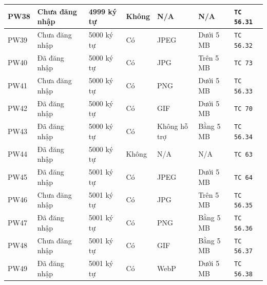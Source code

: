 \documentclass[11pt,a4paper]{article}
\begin{document}
\begin{longtable}{|C{1.2cm}|L{2.4cm}|L{2.6cm}|C{1.6cm}|L{2.5cm}|L{2.2cm}|C{2.0cm}|}
PW38 & Chưa đăng nhập & 4999 ký tự & Không & N/A & N/A & \texttt{TC 56.31} \\ \hline
PW39 & Chưa đăng nhập & 5000 ký tự & Có & JPEG & Dưới 5 MB & \texttt{TC 56.32} \\ \hline
PW40 & Đã đăng nhập & 5000 ký tự & Có & JPG & Trên 5 MB & \texttt{TC 73} \\ \hline
PW41 & Chưa đăng nhập & 5000 ký tự & Có & PNG & Dưới 5 MB & \texttt{TC 56.33} \\ \hline
PW42 & Đã đăng nhập & 5000 ký tự & Có & GIF & Dưới 5 MB & \texttt{TC 70} \\ \hline
PW43 & Đã đăng nhập & 5000 ký tự & Có & Không hỗ trợ & Bằng 5 MB & \texttt{TC 56.34} \\ \hline
PW44 & Đã đăng nhập & 5000 ký tự & Không & N/A & N/A & \texttt{TC 63} \\ \hline
PW45 & Đã đăng nhập & 5001 ký tự & Có & JPEG & Dưới 5 MB & \texttt{TC 64} \\ \hline
PW46 & Chưa đăng nhập & 5001 ký tự & Có & JPG & Trên 5 MB & \texttt{TC 56.35} \\ \hline
PW47 & Đã đăng nhập & 5001 ký tự & Có & PNG & Bằng 5 MB & \texttt{TC 56.36} \\ \hline
PW48 & Chưa đăng nhập & 5001 ký tự & Có & GIF & Bằng 5 MB & \texttt{TC 56.37} \\ \hline
PW49 & Đã đăng nhập & 5001 ký tự & Có & WebP & Dưới 5 MB & \texttt{TC 56.38} \\ \hline
\end{longtable}
\end{document}
